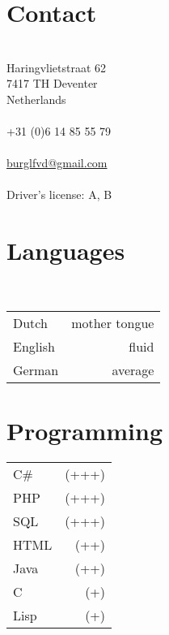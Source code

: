 \documentclass[]{friggeri-cv} %
\begin{document}


\begin{aside} %
\section{Contact}\\
Haringvlietstraat 62\\
7417 TH Deventer\\
Netherlands\\
~\\
+31 (0)6 14 85 55 79\\
~\\
\href{mailto:burglfvd@gmail.com}{burglfvd@gmail.com}\\
~\\
Driver's license: A, B\\

\section{Languages}\\
\begin{tabular}{l r}
   Dutch & mother tongue\\
   English & fluid\\
   German & average\\
\end{tabular}

\section{Programming}
\begin{tabular}{l@{\quad} r}
   C\#  & (+++)\\
   PHP & (+++)\\
   SQL & (+++)\\
   HTML & (++)\\
   Java  & (++)\\
   C & (+)\\
   Lisp & (+)\\
\end{tabular}

\end{aside}
\end{document}

